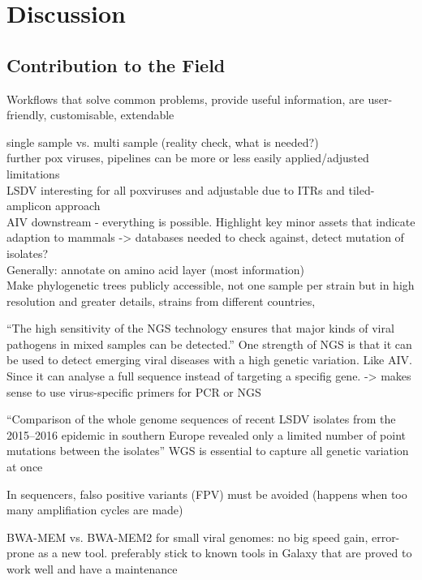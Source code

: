 \chapter{Discussion}\label{chap:discussion}
\todoit

\section{Contribution to the Field}
\todoit
Workflows that solve common problems, provide useful information, are user-friendly, customisable, extendable

single sample vs. multi sample (reality check, what is needed?) \\
further pox viruses, pipelines can be more or less easily applied/adjusted \\
limitations \\
\ac{LSDV} interesting for all poxviruses and adjustable due to \acp{ITR} and tiled-amplicon approach \\
\ac{AIV} downstream - everything is possible. Highlight key minor assets that indicate adaption to mammals -> databases needed to check against, detect mutation of isolates? \\
Generally: annotate on amino acid layer (most information) \\

Make phylogenetic trees publicly accessible, not one sample per strain but in high resolution and greater details, strains from different countries,

``The high sensitivity of the \ac{NGS} technology ensures that major kinds of viral pathogens in mixed samples can be detected.''
One strength of \ac{NGS} is that it can be used to detect emerging viral diseases with a high genetic variation. Like \ac{AIV}. Since it can analyse a full sequence instead of targeting a specifig gene. -> makes sense to use virus-specific primers for \ac{PCR} or \ac{NGS} 

``Comparison of the whole genome sequences of recent \ac{LSDV} isolates from the 2015–2016 epidemic in southern Europe revealed only a limited number of point mutations between the isolates'' \ac{WGS} is essential to capture all genetic variation at once

In sequencers, falso positive variants (\ac{FPV}) must be avoided (happens when too many amplifiation cycles are made)

BWA-MEM vs. BWA-MEM2 for small viral genomes: no big speed gain, error-prone as a new tool. preferably stick to known tools in Galaxy that are proved to work well and have a maintenance

